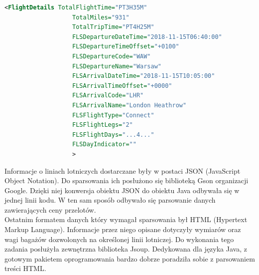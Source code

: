 \documentclass[a4paper, 12pt, twoside]{article}
\begin{document}
\begin{lstlisting}[language=XML, caption=Przykładowe dane w XML]
    <FlightDetails TotalFlightTime="PT3H35M"
                   TotalMiles="931"
                   TotalTripTime="PT4H25M"
                   FLSDepartureDateTime="2018-11-15T06:40:00"
                   FLSDepartureTimeOffset="+0100"
                   FLSDepartureCode="WAW"
                   FLSDepartureName="Warsaw"
                   FLSArrivalDateTime="2018-11-15T10:05:00"
                   FLSArrivalTimeOffset="+0000"
                   FLSArrivalCode="LHR"
                   FLSArrivalName="London Heathrow"
                   FLSFlightType="Connect"
                   FLSFlightLegs="2"
                   FLSFlightDays="...4..."
                   FLSDayIndicator=""
                   >
\end{lstlisting}

\newpage
Informacje o liniach lotniczych dostarczane były w postaci JSON (JavaScript Object Notation). Do sparsowania ich posłużono się biblioteką Gson organizacji Google. Dzięki niej konwersja obiektu JSON do obiektu Java odbywała się w jednej linii kodu. W ten sam sposób odbywało się parsowanie danych zawierających ceny przelotów.\\
Ostatnim formatem danych który wymagał sparsowania był HTML (Hypertext Markup Language). Informacje przez niego opisane dotyczyły wymiarów oraz wagi bagażów dozwolonych na określonej linii lotniczej. Do wykonania tego zadania posłużyła zewnętrzna biblioteka Jsoup. Dedykowana dla języka Java, z gotowym pakietem oprogramowania bardzo dobrze poradziła sobie z parsowaniem treści HTML.
\end{document}
